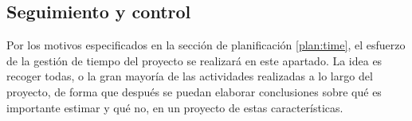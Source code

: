 \subsection{Seguimiento y control}
\label{subsec:syc:timeManagement}
Por los motivos especificados en la sección de planificación \ref{plan:time},
el esfuerzo de la gestión de tiempo del proyecto se realizará en este apartado.
La idea es recoger todas, o la gran mayoría de las actividades realizadas a lo
largo del proyecto, de forma que después se puedan elaborar conclusiones sobre
qué es importante estimar y qué no, en un proyecto de estas características.
